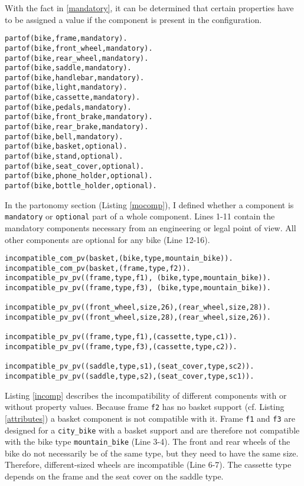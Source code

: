 With the fact in \ref{mandatory}, it can be determined that certain properties have to be assigned a value if the component is present in the configuration. 

\begin{lstlisting}[caption = {Mandatory and Optional Components}, basicstyle=\ttfamily, label = {mocomp}]
partof(bike,frame,mandatory).
partof(bike,front_wheel,mandatory).
partof(bike,rear_wheel,mandatory).
partof(bike,saddle,mandatory).
partof(bike,handlebar,mandatory).
partof(bike,light,mandatory).
partof(bike,cassette,mandatory).
partof(bike,pedals,mandatory).
partof(bike,front_brake,mandatory).
partof(bike,rear_brake,mandatory).
partof(bike,bell,mandatory).
partof(bike,basket,optional).
partof(bike,stand,optional).
partof(bike,seat_cover,optional).
partof(bike,phone_holder,optional).
partof(bike,bottle_holder,optional).
\end{lstlisting}

In the partonomy section (Listing \ref{mocomp}), I defined whether a component is \texttt{mandatory} or \texttt{optional} part of a whole component. Lines 1-11 contain the mandatory components necessary from an engineering or legal point of view. All other components are optional for any bike (Line 12-16).

\begin{lstlisting}[caption = {Incompatibility}, basicstyle=\ttfamily, label = {incomp}]
incompatible_com_pv(basket,(bike,type,mountain_bike)).
incompatible_com_pv(basket,(frame,type,f2)).
incompatible_pv_pv((frame,type,f1), (bike,type,mountain_bike)). 
incompatible_pv_pv((frame,type,f3), (bike,type,mountain_bike)). 

incompatible_pv_pv((front_wheel,size,26),(rear_wheel,size,28)).
incompatible_pv_pv((front_wheel,size,28),(rear_wheel,size,26)).

incompatible_pv_pv((frame,type,f1),(cassette,type,c1)).
incompatible_pv_pv((frame,type,f3),(cassette,type,c2)).

incompatible_pv_pv((saddle,type,s1),(seat_cover,type,sc2)).
incompatible_pv_pv((saddle,type,s2),(seat_cover,type,sc1)).
\end{lstlisting}

Listing \ref{incomp} describes the incompatibility of different components with or without property values. Because frame \texttt{f2} has no basket support (cf. Listing \ref{attributes}) a basket component is not compatible with it. Frame \texttt{f1} and \texttt{f3} are designed for a \texttt{city\_bike} with a basket support and are therefore not compatible with the bike type \texttt{mountain\_bike} (Line 3-4). The front and rear wheels of the bike do not necessarily be of the same type, but they need to have the same size. Therefore, different-sized wheels are incompatible (Line 6-7). The cassette type depends on the frame and the seat cover on the saddle type.  

